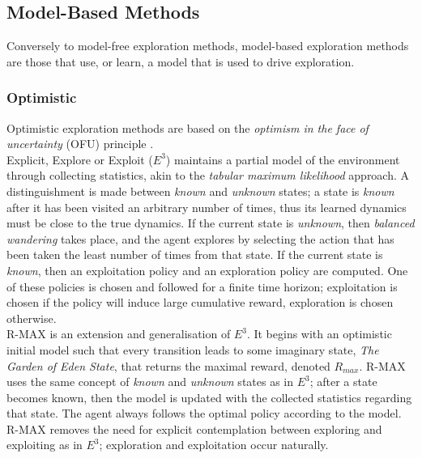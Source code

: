 \subsection{Model-Based Methods}
Conversely to model-free exploration methods, model-based exploration methods are those that use, or learn, a model that is used to drive exploration.
\subsubsection{Optimistic}
Optimistic exploration methods are based on the \textit{optimism in the face of uncertainty} (OFU) principle \cite{DBLP:journals/corr/cs-AI-9605103}.
\\Explicit, Explore or Exploit ($E^3$)  \cite{Kearns+Singh:2002} maintains a partial model of the environment through collecting statistics, akin to the \textit{tabular maximum likelihood} approach. A distinguishment is made between \textit{known} and \textit{unknown} states; a state is \textit{known} after it has been visited an arbitrary number of times, thus its learned dynamics must be close to the true dynamics. If the current state is \textit{unknown}, then \textit{balanced wandering} takes place, and the agent explores by selecting the action that has been taken the least number of times from that state. If the current state is \textit{known}, then an exploitation policy and an exploration policy are computed. One of these policies is chosen and followed for a finite time horizon; exploitation is chosen if the policy will induce large cumulative reward, exploration is chosen otherwise.
\\ R-MAX \cite{10.1162/153244303765208377} is an extension and generalisation of $E^3$. It begins with an optimistic initial model such that every transition leads to some imaginary state, \textit{The Garden of Eden State}, that returns the maximal reward, denoted $R_{max}$. R-MAX uses the same concept of \textit{known} and \textit{unknown} states as in $E^3$; after a state becomes known, then the model is updated with the collected statistics regarding that state. The agent always follows the optimal policy according to the model. R-MAX removes the need for explicit contemplation between exploring and exploiting as in $E^3$; exploration and exploitation occur naturally.
